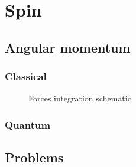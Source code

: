 \section{Spin}
	\subsection{Angular momentum}
		\subsubsection{Classical}
			\begin{figure}[!h]
				\centering
				\caption{Forces integration schematic}
				\label{clasmoment}
			\end{figure}
		\subsubsection{Quantum}
		
	\subsection{Problems}